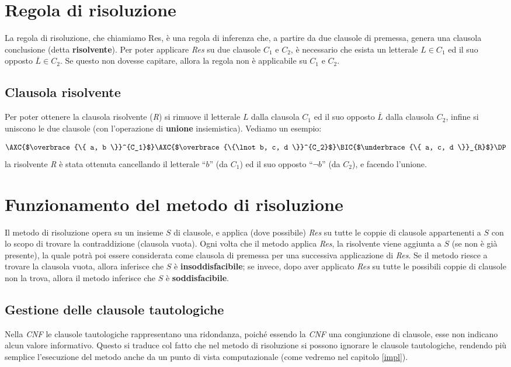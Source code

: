 \documentclass[a4paper,12pt]{report}
\begin{document}
\section{Regola di risoluzione}
\label{Res}
La regola di risoluzione, che chiamiamo Res, è una regola di inferenza che, a partire da due clausole di premessa, genera una clausola conclusione (detta \textbf{risolvente}). Per poter applicare \emph{Res} su due clausole $C_1$ e $C_2$, è necessario che esista un letterale $L \in C_1$ ed il suo opposto $\overline{L} \in C_2$. Se questo non dovesse capitare, allora la regola non è applicabile su $C_1$ e $C_2$.

\subsection{Clausola risolvente}
Per poter ottenere la clausola risolvente (\emph{R}) si rimuove il letterale $L$ dalla clausola $C_1$ ed il suo opposto $\overline{L}$ dalla clausola $C_2$, infine si uniscono le due clausole (con l'operazione di \textbf{unione} insiemistica). Vediamo un esempio:

\[
    \AXC{$\overbrace{\{ a, b \}}^{C_1}$}
    \AXC{$\overbrace{\{\lnot b, c, d \}}^{C_2}$}
    \RightLabel{Res}
    \BIC{$\underbrace{\{ a, c, d \}}_{R}$}
    \DP
\]
la risolvente \emph{R} è stata ottenuta cancellando il letterale ``$b$'' (da $C_1$) ed il suo opposto ``$\lnot b$'' (da $C_2$), e facendo l'unione.

\section{Funzionamento del metodo di risoluzione}
Il metodo di risoluzione opera su un insieme $S$ di clausole, e applica (dove possibile) \emph{Res} su tutte le coppie di clausole appartenenti a $S$ con lo scopo di trovare la contraddizione (clausola vuota). Ogni volta che il metodo applica \emph{Res}, la risolvente viene aggiunta a $S$ (se non è già presente), la quale potrà poi essere considerata come clausola di premessa per una successiva applicazione di \emph{Res}. Se il metodo riesce a trovare la clausola vuota, allora inferisce che $S$ è \textbf{insoddisfacibile}; se invece, dopo aver applicato \emph{Res} su tutte le possibili coppie di clausole non la trova, allora il metodo inferisce che $S$ è \textbf{soddisfacibile}.

\subsection{Gestione delle clausole tautologiche}
Nella \emph{CNF} le clausole tautologiche rappresentano una ridondanza, poiché essendo la \emph{CNF} una congiunzione di clausole, esse non indicano alcun valore informativo. Questo si traduce col fatto che nel metodo di risoluzione si possono ignorare le clausole tautologiche, rendendo più semplice l'esecuzione del metodo anche da un punto di vista computazionale (come vedremo nel capitolo \ref{impl}).
\end{document}
